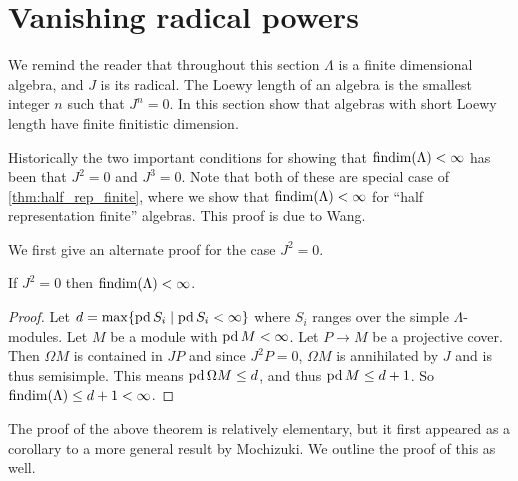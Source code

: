 \section{Vanishing radical powers}\label{sec:vanishing_radical}

We remind the reader that throughout this section $\Lambda$ is a finite dimensional algebra, and $J$ is its radical. The Loewy length of an algebra is the smallest integer $n$ such that $J^n = 0$. In this section show that algebras with short Loewy length have finite finitistic dimension.

Historically the two important conditions for showing that $\operatorname{findim}(\Lambda) < \infty$ has been that $J^2=0$ and $J^3=0$. Note that both of these are special case of \cref{thm:half_rep_finite}, where we show that $\operatorname{findim}(\Lambda) < \infty$ for ``half representation finite'' algebras. This proof is due to Wang\cite{Wang94}.

We first give an alternate proof for the case $J^2=0$.

\begin{theorem}\label{thm:J2_equals_0_implies_FDC}
	If $J^2=0$ then $\operatorname{findim}(\Lambda) < \infty$.
	\begin{proof}
		Let $d = \max\{\operatorname{pd} S_i \mid \operatorname{pd} S_i < \infty\}$ where $S_i$ ranges over the simple $\Lambda$-modules. Let $M$ be a module with $\operatorname{pd} M < \infty$. Let $P \to M$ be a projective cover. Then $\Omega M$ is contained in $JP$ and since $J^2P=0$, $\Omega M$ is annihilated by $J$ and is thus semisimple. This means $\operatorname{pd} \Omega M \leq d$, and thus $\operatorname{pd} M \leq d+1$. So $\operatorname{findim}(\Lambda) \leq d+1 < \infty$.
	\end{proof}
\end{theorem}

The proof of the above theorem is relatively elementary, but it first appeared as a corollary to a more general result by Mochizuki\cite{Moc65}. We outline the proof of this as well.

